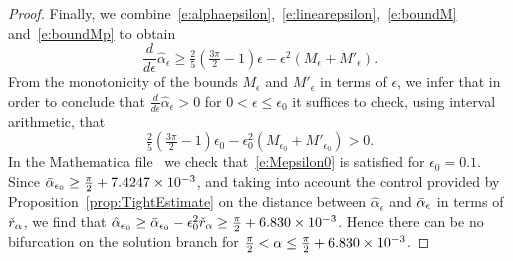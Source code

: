 \begin{proof}
Finally, we combine~\eqref{e:alphaepsilon},~\eqref{e:linearepsilon},~\eqref{e:boundM} and~\eqref{e:boundMp} to obtain
\[
 \frac{d }{d \epsilon} \hat{\alpha}_\epsilon  \geq 
 \tfrac{2}{5} ( \tfrac{3 \pi}{2} -1) \epsilon - \epsilon^2 ( M_{\epsilon} + M'_{\epsilon}).
\]
From the monotonicity of the bounds $M_\epsilon$ and $M'_\epsilon$ in terms of $\epsilon$, we infer that in order to conclude that  $\frac{d }{d \epsilon} \hat{\alpha}_\epsilon >0 $ for $0<\epsilon\leq\epsilon_0$  it suffices to check, using interval arithmetic, that
\begin{equation}
 \tfrac{2}{5} ( \tfrac{3 \pi}{2} -1) \epsilon_0 - \epsilon_0^2 (M_{\epsilon_0} + M'_{\epsilon_0})  > 0 . \label{e:Mepsilon0}
\end{equation} 
In the Mathematica file~\cite{mathematicafile} we check that~\eqref{e:Mepsilon0} is satisfied 
for $\epsilon_0 = 0.1$.
Since $\bar{\alpha}_{\epsilon_0} \geq \tfrac{\pi}{2} + 7.4247\times 10^{-3}$,
and taking into account the control provided by Proposition~\ref{prop:TightEstimate} on the distance between $\hat{\alpha}_\epsilon$ and $\bar{\alpha}_\epsilon$ in terms of $\check{r}_\alpha$, we
find that  
 $\hat{\alpha}_{\epsilon_0} \geq \bar{\alpha}_{\epsilon_0} - \epsilon_0^2 \check{r}_\alpha \geq \tfrac{\pi}{2} + 6.830  \times 10^{-3}$.
Hence  there can be no bifurcation on the solution branch for 
 $ \tfrac{\pi}{2} < \alpha \leq \tfrac{\pi}{2} + 6.830   \times 10^{-3}$.
\end{proof}	



